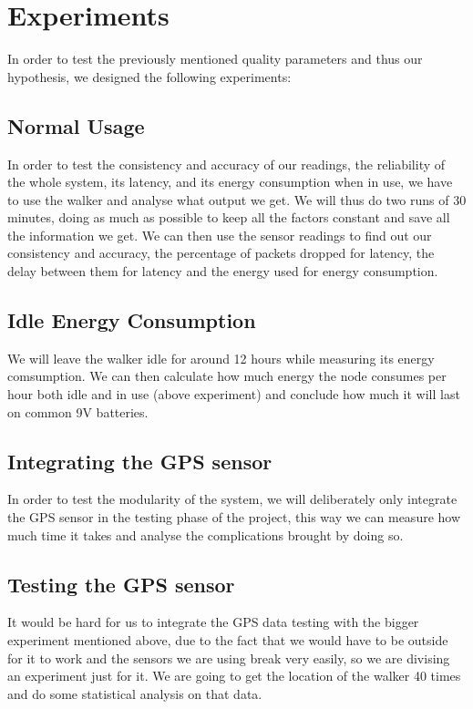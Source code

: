\section{Experiments}
	In order to test the previously mentioned quality parameters and thus our hypothesis, we designed the following experiments:

	\subsection{Normal Usage}
		In order to test the consistency and accuracy of our readings, the reliability of the whole system, its latency, and its energy consumption when in use, we have to use the walker and analyse what output we get. We will thus do two runs of 30 minutes, doing as much as possible to keep all the factors constant and save all the information we get. We can then use the sensor readings to find out our consistency and accuracy, the percentage of packets dropped for latency, the delay between them for latency and the energy used for energy consumption.

	\subsection{Idle Energy Consumption}
		We will leave the walker idle for around 12 hours while measuring its energy comsumption.
		We can then calculate how much energy the node consumes per hour both idle and in use (above experiment) and conclude how much it will last on common 9V batteries.

	\subsection{Integrating the GPS sensor}
		In order to test the modularity of the system, we will deliberately only integrate the GPS sensor in the testing phase of the project, this way we can measure how much time it takes and analyse the complications brought by doing so.

	\subsection{Testing the GPS sensor}
		It would be hard for us to integrate the GPS data testing with the bigger experiment mentioned above, due to the fact that we would have to be outside for it to work and the sensors we are using break very easily, so we are divising an experiment just for it.
		We are going to get the location of the walker 40 times and do some statistical analysis on that data.

